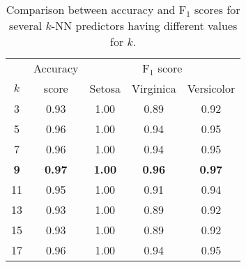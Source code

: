 
\begin{table}
	\caption{Comparison between accuracy and F$_1$ scores for several $k$-NN predictors having different values for $k$.}
	\label{tab:predictor}
	\begin{tabular}{c|c|ccc}
		\toprule
		& Accuracy & \multicolumn{3}{c}{F$_1$ score}\\
 		$k$ & score & Setosa & Virginica & Versicolor \\
		\midrule
		3 & 0.93 & 1.00 & 0.89 & 0.92 \\
		5 & 0.96 & 1.00 & 0.94 & 0.95 \\
		7 & 0.96 & 1.00 & 0.94 & 0.95 \\
		\textbf{9} & \textbf{0.97} & \textbf{1.00} & \textbf{0.96} & \textbf{0.97} \\
		11 & 0.95 & 1.00 & 0.91 & 0.94 \\
		13 & 0.93 & 1.00 & 0.89 & 0.92 \\
		15 & 0.93 & 1.00 & 0.89 & 0.92 \\
		17 & 0.96 & 1.00 & 0.94 & 0.95 \\
		\bottomrule
	\end{tabular}
\end{table}